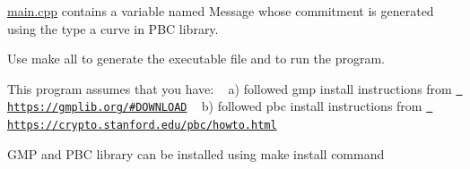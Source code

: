 {\ttfamily \mbox{\hyperlink{main_8cpp}{main.\+cpp}}} contains a variable named {\ttfamily Message} whose commitment is generated using the type a curve in P\+BC library.

Use {\ttfamily make all} to generate the executable file and to run the program.

This program assumes that you have\+: ~\newline
 a) followed gmp install instructions from \href{https://gmplib.org/\#DOWNLOAD}{\texttt{ https\+://gmplib.\+org/\#\+D\+O\+W\+N\+L\+O\+AD}} ~\newline
 b) followed pbc install instructions from \href{https://crypto.stanford.edu/pbc/howto.html}{\texttt{ https\+://crypto.\+stanford.\+edu/pbc/howto.\+html}} ~\newline


G\+MP and P\+BC library can be installed using {\ttfamily make install} command 